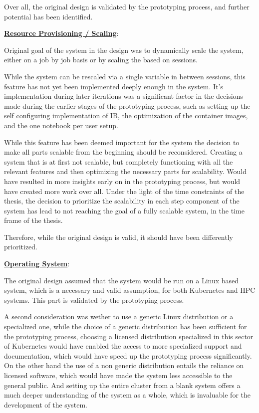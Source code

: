 Over all, the original design is validated by the prototyping process, and further potential
has been identified.

\textbf{\hyperref[asp:resource_provisioning]{Resource Provisioning / Scaling}}:

Original goal of the system in the design was to dynamically scale the system,
either on a job by job basis or by scaling the based on sessions.

While the system can be rescaled via a single variable in between sessions,
this feature has not yet been implemented deeply enough in the system.
It's implementation during later iterations was a significant factor in the decisions
made during the earlier stages of the prototyping process, such as setting
up the self configuring implementation of \ac{IB}, the optimization of the container images,
and the one notebook per user setup.

While this feature has been deemed important for the system the decision to
make all parts scalable from the beginning should be reconsidered.
Creating a system that is at first not scalable, but completely functioning
with all the relevant features and then optimizing the necessary parts for
scalability. Would have resulted in more insights early on in the prototyping process,
but would have created more work over all.
Under the light of the time constraints of the thesis, the decision to
prioritize the scalability in each step component of the system has lead to
not reaching the goal of a fully scalable system, in the time frame of the thesis.

Therefore, while the original design is valid, it should have been differently prioritized.


\textbf{\hyperref[asp:operating_system]{Operating System}}:

The original design assumed that the system would be run on a Linux based system,
which is a necessary and valid assumption, for both Kubernetes and \ac{HPC} systems.
This part is validated by the prototyping process.

A second consideration was wether to use a generic Linux distribution or a specialized one,
while the choice of a generic distribution has been sufficient for the prototyping process,
choosing a licensed distribution specialized in this sector of Kubernetes would have
enabled the access to more specialized support and documentation, which would have
speed up the prototyping process significantly.
On the other hand the use of a non generic distribution entails the reliance on
licensed software, which would have made the system less accessible to the general public.
And setting up the entire cluster from a blank system offers a much deeper understanding
of the system as a whole, which is invaluable for the development of the system.

